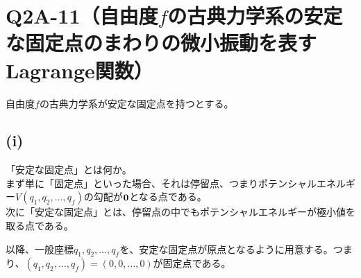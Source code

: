   \section{Q2A-11（自由度$f$の古典力学系の安定な固定点のまわりの微小振動を表すLagrange関数）}
  自由度$f$の古典力学系が安定な固定点を持つとする。

  \subsection*{(i)}
  「安定な固定点」とは何か。\\
  まず単に「固定点」といった場合、それは停留点、つまりポテンシャルエネルギー$V(q_1,q_2,\dots,q_f)$の勾配が$\boldsymbol{\mathrm{0}}$となる点である。\\
  次に「安定な固定点」とは、停留点の中でもポテンシャルエネルギーが極小値を取る点である。

  以降、一般座標$q_1,q_2,\dots,q_f$を、安定な固定点が原点となるように用意する。つまり、$(q_1,q_2,\dots,q_f)=(0,0,\dots,0)$が固定点である。
  
